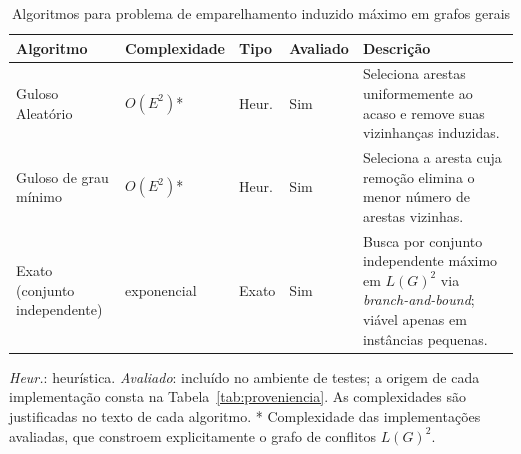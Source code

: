 \begin{table}[H]
    \centering
    \caption{Algoritmos para problema de emparelhamento induzido máximo em grafos gerais}
    \label{tab:emp_induz_max_gerais}
    \renewcommand{\arraystretch}{1.2} %
    \footnotesize
    
    \begin{tabularx}{\textwidth}{@{} >{\raggedright\arraybackslash}p{2.8cm} l l l >{\raggedright\arraybackslash}X @{}}
        \toprule
        \textbf{Algoritmo} & \textbf{Complexidade} & \textbf{Tipo} & \textbf{Avaliado} & \textbf{Descrição} \\
        \midrule
        
        Guloso Aleatório & $O(E^2)$* & Heur. & Sim & 
        Seleciona arestas uniformemente ao acaso e remove suas vizinhanças induzidas. \\
        \addlinespace 

        Guloso de grau mínimo & $O(E^2)$* & Heur. & Sim & 
        Seleciona a aresta cuja remoção elimina o menor número de arestas vizinhas. \\
        
        \addlinespace

        Exato (conjunto independente) & exponencial & Exato & Sim & 
        Busca por conjunto independente máximo em $L(G)^2$ via \textit{branch-and-bound}; viável apenas em instâncias pequenas. \\
        
        \bottomrule
    \end{tabularx}
    \par\smallskip
    {\raggedright\footnotesize \textit{Heur.}: heurística. \textit{Avaliado}: incluído no ambiente de testes; a origem de cada implementação consta na Tabela~\ref{tab:proveniencia}. As complexidades são justificadas no texto de cada algoritmo. * Complexidade das implementações avaliadas, que constroem explicitamente o grafo de conflitos $L(G)^2$.\par}
\end{table}


